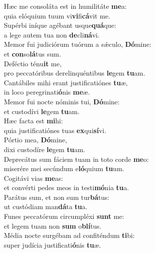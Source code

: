 \evenverse Hæc me consoláta est in humilitáte \textbf{me}a:~\*\\
\evenverse quia elóquium tuum vi\textbf{vi}fi\textbf{cá}vit me.\\
\oddverse Supérbi iníque agébant usque\textbf{quá}que:~\*\\
\oddverse a lege autem tua non \textbf{de}cli\textbf{ná}vi.\\
\evenverse Memor fui judiciórum tuórum a sǽculo, \textbf{Dó}mine:~\*\\
\evenverse et \textbf{con}so\textbf{lá}tus sum.\\
\oddverse Deféctio ténu\textbf{it} me,~\*\\
\oddverse pro peccatóribus derelinquéntibus \textbf{le}gem \textbf{tu}am.\\
\evenverse Cantábiles mihi erant justificatiónes \textbf{tu}æ,~\*\\
\evenverse in loco peregrinati\textbf{ó}nis \textbf{me}æ.\\
\oddverse Memor fui nocte nóminis tui, \textbf{Dó}mine:~\*\\
\oddverse et custodívi \textbf{le}gem \textbf{tu}am.\\
\evenverse Hæc facta est \textbf{mi}hi:~\*\\
\evenverse quia justificatiónes tuas \textbf{ex}qui\textbf{sí}vi.\\
\oddverse Pórtio mea, \textbf{Dó}mine,~\*\\
\oddverse dixi custodíre \textbf{le}gem \textbf{tu}am.\\
\evenverse Deprecátus sum fáciem tuam in toto corde \textbf{me}o:~\*\\
\evenverse miserére mei secúndum e\textbf{ló}quium \textbf{tu}um.\\
\oddverse Cogitávi vias \textbf{me}as:~\*\\
\oddverse et convérti pedes meos in testi\textbf{mó}nia \textbf{tu}a.\\
\evenverse Parátus sum, et non sum tur\textbf{bá}tus:~\*\\
\evenverse ut custódiam man\textbf{dá}ta \textbf{tu}a.\\
\oddverse Funes peccatórum circumpléxi \textbf{sunt} me:~\*\\
\oddverse et legem tuam non \textbf{sum} o\textbf{blí}tus.\\
\evenverse Média nocte surgébam ad confiténdum \textbf{ti}bi:~\*\\
\evenverse super judícia justificati\textbf{ó}nis \textbf{tu}æ.\\
